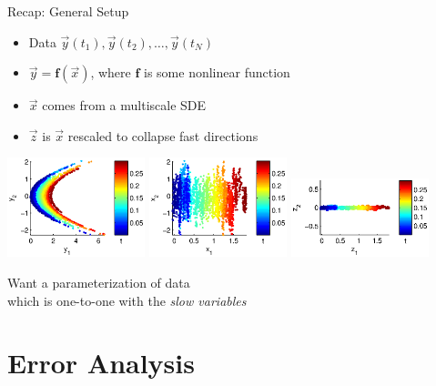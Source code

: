 \documentclass[12pt]{beamer}
\begin{document}
\begin{frame}{Recap: General Setup}


\begin{itemize}

\item Data $\vec{y}(t_1), \vec{y}(t_2), \dots, \vec{y}(t_N)$


\item $\vec{y} = \mathbf{f}(\vec{x})$, where $\mathbf{f}$ is some nonlinear function


\item $\vec{x}$ comes from a multiscale SDE


\item $\vec{z}$ is $\vec{x}$ rescaled to collapse fast directions



\end{itemize}

\centering
\includegraphics[width=0.3\textwidth]{data_init_nonlinear}
\hfill
\includegraphics[width=0.3\textwidth]{data_init}
\hfill
\includegraphics[width=0.3\textwidth]{data_rescaled}

 Want a parameterization of data \\which is one-to-one with the {\em slow variables}

\end{frame}

\section{Error Analysis}

%
%
%
%
%
%
\end{document}
